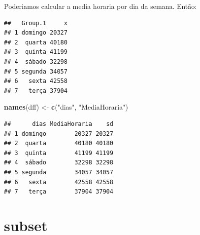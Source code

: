 \documentclass[]{book}
\newenvironment{Shaded}{\begin{snugshade}}{\end{snugshade}}
\newcommand{\KeywordTok}[1]{\textcolor[rgb]{0.13,0.29,0.53}{\textbf{#1}}}
\newcommand{\DataTypeTok}[1]{\textcolor[rgb]{0.13,0.29,0.53}{#1}}
\newcommand{\StringTok}[1]{\textcolor[rgb]{0.31,0.60,0.02}{#1}}
\newcommand{\OperatorTok}[1]{\textcolor[rgb]{0.81,0.36,0.00}{\textbf{#1}}}
\newcommand{\NormalTok}[1]{#1}
\begin{document}
Poderiamos calcular a media horaria por dia da semana. Então:

\begin{Shaded}
\end{Shaded}

\begin{verbatim}
##   Group.1     x
## 1 domingo 20327
## 2  quarta 40180
## 3  quinta 41199
## 4  sábado 32298
## 5 segunda 34057
## 6   sexta 42558
## 7   terça 37904
\end{verbatim}

\begin{Shaded}
\begin{Highlighting}[]
\KeywordTok{names}\NormalTok{(dff) <-}\StringTok{ }\KeywordTok{c}\NormalTok{(}\StringTok{"dias"}\NormalTok{, }\StringTok{"MediaHoraria"}\NormalTok{)}
\end{Highlighting}
\end{Shaded}

\begin{Shaded}
\end{Shaded}

\begin{verbatim}
##      dias MediaHoraria    sd
## 1 domingo        20327 20327
## 2  quarta        40180 40180
## 3  quinta        41199 41199
## 4  sábado        32298 32298
## 5 segunda        34057 34057
## 6   sexta        42558 42558
## 7   terça        37904 37904
\end{verbatim}

\section{subset}\label{subset}
\end{document}
